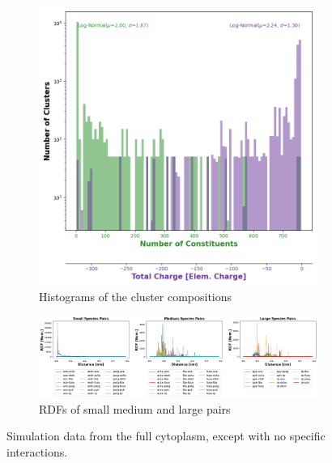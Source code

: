 \documentclass[draft, english]{volcanica-template}
\begin{document}
\begin{figure}[!htbp]
\begin{figure}[!htbp]
\centering
\includegraphics[width=0.7\linewidth]{files/Cluster_Histogram_Fi-9b264bdec452d209f5a6cac86dce34e9.png}
\caption[]{Histograms of the cluster compositions}
\label{Fig8_CytoSys-c}
\end{figure}

\begin{figure}[!htbp]
\centering
\includegraphics[width=0.7\linewidth]{files/Pairwise_RDFs_ij-194d84bb8e75700bdc3a883224dc6008.png}
\caption[]{RDFs of small medium and large pairs}
\label{Fig8_CytoSys-d}
\end{figure}
\caption[]{Simulation data from the full cytoplasm, except with no specific interactions.}
\label{Fig8_CytoSys-d}
\end{figure}
\end{document}
